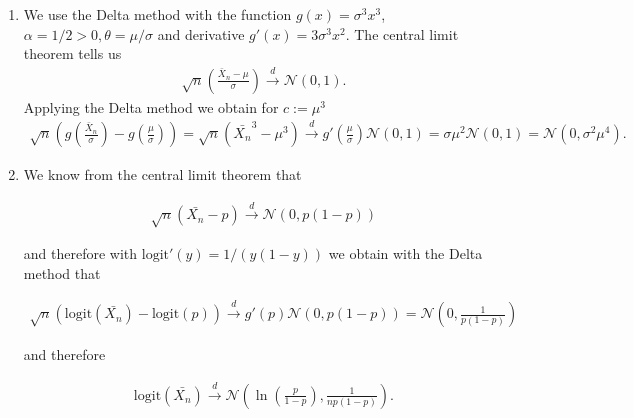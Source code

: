\begin{solution}

\phantom{}

\begin{enumerate}[label = (\alph*)]
  \item We use the Delta method with the function
  $g(x) = \sigma^3x^3$, $\alpha = 1/2 > 0, \theta = \mu/\sigma$
  and derivative $g'(x) = 3\sigma^3x^2$.
  The central limit theorem tells us
  \begin{align*}
    \sqrt{n}\left(\frac{\bar{X}_n - \mu}{\sigma}\right) \xrightarrow{\ d \ } \mathcal{N}(0,1).
  \end{align*}
  Applying the Delta method we obtain for $c := \mu^3$
  \begin{align*}
    \sqrt{n}\left(g\left(\frac{\bar{X}_n}{\sigma}\right) - g\left(\frac{\mu}{\sigma}\right)\right)
    = \sqrt{n}(\bar{X_n}^3 - \mu^3) \xrightarrow{\ d \ } g'\left(\frac{\mu}{\sigma}\right)\mathcal{N}(0,1)
    = \sigma\mu^2\mathcal{N}(0,1) = \mathcal{N}(0, \sigma^2\mu^4).
  \end{align*}

  \item We know from the central limit theorem that

  \begin{align*}
    \sqrt{n}(\bar{X_n} - p) \xrightarrow{\ d \ } \mathcal{N}(0,p(1-p))
  \end{align*}

  and therefore with $\mathrm{logit}'(y) = 1/(y(1-y))$ we obtain with the Delta method that

  \begin{align*}
    \sqrt{n}(\mathrm{logit}(\bar{X_n}) - \mathrm{logit}(p)) \xrightarrow{\ d \ }
    g'(p)\mathcal{N}(0,p(1-p)) = \mathcal{N}\left(0,\frac{1}{p(1-p)}\right)
  \end{align*}

  and therefore

  \begin{align*}
    \mathrm{logit}(\bar{X_n}) \xrightarrow{\ d \ }
    \mathcal{N}\left(\ln\left(\frac{p}{1-p}\right),\frac{1}{np(1-p)}\right).
  \end{align*}

\end{enumerate}


\end{solution}

